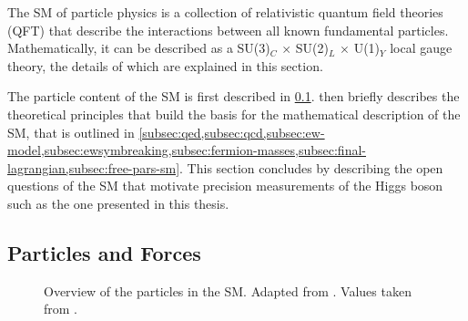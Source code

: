 

The SM of particle physics is a collection of relativistic quantum field theories (QFT) that describe the interactions between all known fundamental particles.
Mathematically, it can be described as a SU(3)$_C$ $\times$ SU(2)$_L$ $\times$ U(1)$_Y$ local gauge theory, the details of which are explained in this section.

The particle content of the SM is first described in \cref{subsec:particle-content}.  then briefly describes the theoretical principles that build the basis for the mathematical description of the SM, that is outlined in \cref{subsec:qed,subsec:qcd,subsec:ew-model,subsec:ewsymbreaking,subsec:fermion-masses,subsec:final-lagrangian,subsec:free-pars-sm}. This section concludes by describing the open questions of the SM that motivate precision measurements of the Higgs boson such as the one presented in this thesis.






\subsection{Particles and Forces}
\label{subsec:particle-content}

\begin{figure}
  \caption[Overview of particles in the SM.]{Overview of the particles in the SM. Adapted from . Values taken from .}  
  \label{fig:particles-infographic}
\end{figure}


